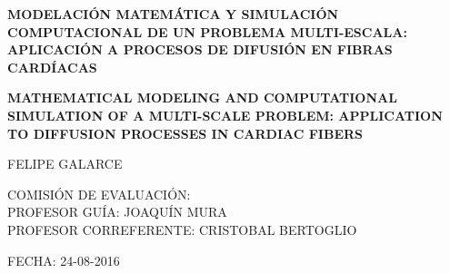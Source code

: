 \documentclass[letterpaper]{article} 			     	%
\begin{document}
\thispagestyle{fancy}
\fontsize{14}{12}\selectfont

\vspace*{2 cm}
\begin{center}
\textbf{MODELACIÓN MATEMÁTICA Y SIMULACIÓN COMPUTACIONAL DE UN PROBLEMA MULTI-ESCALA: APLICACIÓN A PROCESOS DE DIFUSIÓN EN FIBRAS CARDÍACAS}
\end{center}
\vspace*{1 cm}
\begin{center}
\textbf{MATHEMATICAL MODELING AND COMPUTATIONAL SIMULATION OF A MULTI-SCALE PROBLEM: APPLICATION TO DIFFUSION PROCESSES IN CARDIAC FIBERS }
\end{center}
\fontsize{12}{12}\selectfont
\vspace*{2 cm}
\begin{center}
FELIPE GALARCE
\end{center}
\vspace*{1 cm}
\fontsize{11}{12}\selectfont
\begin{center}
COMISIÓN DE EVALUACIÓN:\\
\vspace*{0.8 cm}
PROFESOR GUÍA: JOAQUÍN MURA \\
\vspace*{1 cm}
PROFESOR CORREFERENTE: CRISTOBAL BERTOGLIO
\fontsize{11}{12}\selectfont

\vspace*{5.5 cm}
FECHA: 24-08-2016 
\end{center}
\newpage
\end{document}

